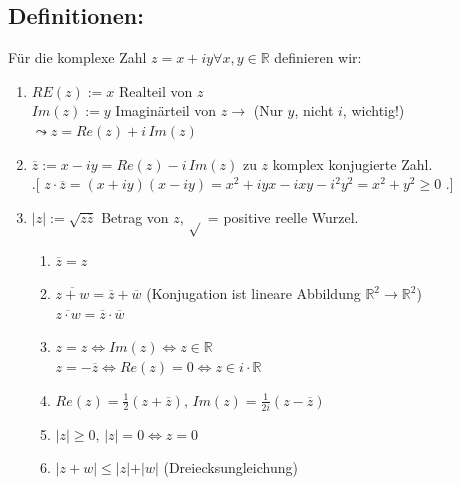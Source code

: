 \subsection{Definitionen:}
Für die komplexe Zahl $z=x+iy \forall x,y \in \mathbb{R}$ definieren wir:
\begin{enumerate}
\item $RE(z):=x$ Realteil von $z$\\
	$Im(z):=y$ Imaginärteil von $z \rightarrow$ (Nur $y$, nicht $i$, wichtig!)\\
	$\leadsto z=Re(z)+i\,Im(z)$
\item $\overline{z}:=x-iy=Re(z)-i\,Im(z)$ zu $z$ komplex konjugierte Zahl. \\
	.[ $z\cdot\overline{z} = (x+iy)(x-iy) = x^{2}+iyx-ixy-i^{2}y^{2} = x^{2}+y^{2}\geq0$ .]
\item $\vert z\vert :=\sqrt{z\overline{z}}$ Betrag von $z$, $\sqrt{}$ = positive reelle Wurzel.\\
	\begin{enumerate}
	\item $\overline{z}=z$
	\item $\overline{z+w}=\overline{z}+\overline{w}$  (Konjugation ist lineare Abbildung 
	$\mathbb{R}^{2}\rightarrow\mathbb{R}^{2}$)\\
	$\overline{z\cdot w} = \overline{z}\cdot\overline{w}$
	\item $z=z\Leftrightarrow Im(z)\Leftrightarrow z\in \mathbb{R}$\\
	$z=-\overline{z}\Leftrightarrow Re(z)=0\Leftrightarrow z \in i\cdot\mathbb{R}$
	\item $Re(z)=\frac{1}{2}(z+\overline{z}), \,Im(z)=\frac{1}{2i}(z-\overline{z})$
	\item$\vert z\vert \geq 0, \,  \vert z \vert = 0 \Leftrightarrow z = 0$
	\item $\vert z+w \vert \leq \vert z \vert + \vert w \vert$ (Dreiecksungleichung)
	\end{enumerate}
\end{enumerate}